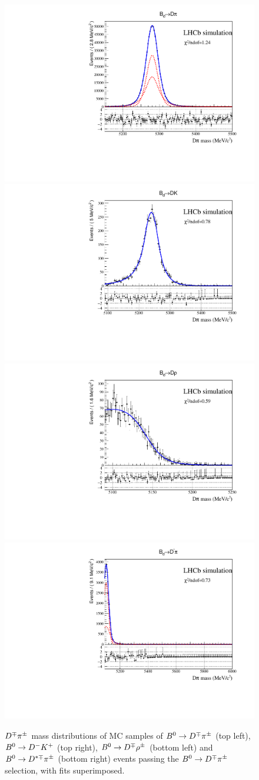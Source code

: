 \begin{figure}[t]
	\centering
	\includegraphics[width=0.45\linewidth]{03Massfit/figs/Template_combData_Signal_both_kpipi_2012_Bd2DPiHypo_BeautyMass_binned.pdf}
	\includegraphics[width=0.45\linewidth]{03Massfit/figs/Template_combData_Bd2DK_both_2012_Bd2DPiHypo_BeautyMass.pdf} \\
	\includegraphics[width=0.45\linewidth]{03Massfit/figs/Template_combData_Bd2DRho_both_2012_Bd2DPiHypo_BeautyMass.pdf}
	\includegraphics[width=0.45\linewidth]{03Massfit/figs/Template_combData_Bd2DstPi_both_2012_Bd2DPiHypo_BeautyMass.pdf} \\
        \vspace{-2mm}
	\caption{$D^\mp\pi^\pm$ mass distributions of MC samples of $B^0\rightarrow D^\mp\pi^\pm$ (top left), $B^0\rightarrow D^-K^+$ (top right),
          $B^0\rightarrow D^\mp\rho^\pm$ (bottom left) and $B^0\rightarrow D^{*\mp}\pi^\pm$ (bottom right) events passing the $B^0\rightarrow D^\mp\pi^\pm$
          selection, with fits superimposed.}
	\label{fig:MCPisample}
\end{figure}

